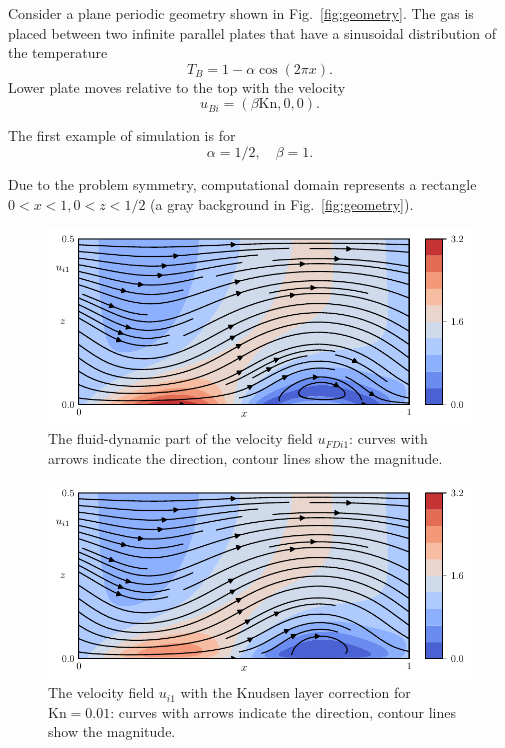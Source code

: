 \documentclass[smallextended, referee]{svjour3} %
\newcommand{\Kn}{\mathrm{Kn}}
\begin{document}
Consider a plane periodic geometry shown in Fig.~\ref{fig:geometry}.
The gas is placed between two infinite parallel plates
that have a sinusoidal distribution of the temperature
\begin{equation}
	T_B = 1-\alpha\cos(2\pi x).
\end{equation}
Lower plate moves relative to the top with the velocity
\begin{equation}
	u_{Bi} = (\beta\Kn,0,0).
\end{equation}

The first example of simulation is for
\[ \alpha=1/2, \quad \beta = 1. \]

Due to the problem symmetry, computational domain represents a rectangle \(0<x<1, 0<z<1/2\)
(a gray background in Fig.~\ref{fig:geometry}).

\begin{figure}
	\centering
	\includegraphics{Fig5}
	\caption{The fluid-dynamic part of the velocity field \(u_{FDi1}\):
		curves with arrows indicate the direction, contour lines show the magnitude.}
	\label{fig:moving:fluid}
\end{figure}

\begin{figure}
	\centering
	\includegraphics{Fig6}
	\caption{The velocity field \(u_{i1}\) with the Knudsen layer correction for \(\Kn=0.01\):
		curves with arrows indicate the direction, contour lines show the magnitude.}
	\label{fig:moving:kn001}
\end{figure}
\end{document}
